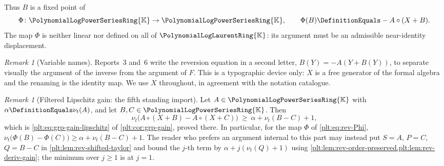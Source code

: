 \documentclass[11pt,oneside]{article}
\theoremstyle{plain}
\theoremstyle{definition}
\theoremstyle{remark}
\newtheorem{remark}[theorem]{Remark}
\newcommand{\K}{\mathbb{K}}
\newcommand{\PLpow}{\PolynomialLogPowerSeriesRing{\K}}   %
\newcommand{\PLlau}{\PolynomialLogLaurentRing{\K}}       %
\newcommand{\ordt}{\nu_{t}}                              %
\newcommand{\compose}{\mathbin{\circ}}
\begin{document}
Thus \(B\) is a fixed point of
\begin{equation}\label{plt:eq:rev-Phi}
 \Phi\colon\PLpow\to\PLpow,
 \qquad
 \Phi(B)\DefinitionEquals-A\compose(X+B).
\end{equation}
The map \(\Phi\) is neither linear nor defined on all of \(\PLlau\): its
argument must be an admissible near-identity displacement.

\begin{remark}[Variable names]
\label{plt:rmk:rev-variable-names}
Reports~3 and~6 write the reversion equation in a second letter,
\(B(Y)=-A(Y+B(Y))\), to separate visually the argument of the inverse from the
argument of \(F\).  This is a typographic device only: \(X\) is a free
generator of the formal algebra and the renaming is the identity map.  We use
\(X\) throughout, in agreement with the notation catalogue.
\end{remark}

\begin{remark}[Filtered Lipschitz gain: the fifth standing import]
\label{plt:lem:rev-gain}
Let \(A\in\PLpow\) with \(\alpha\DefinitionEquals\ordt(A)\), and let
\(B,C\in\PLpow\).  Then
\begin{equation}\label{plt:eq:rev-gain}
 \ordt\bigl(A\compose(X+B)-A\compose(X+C)\bigr)
 \ \ge\ \alpha+\ordt(B-C)+1 ,
\end{equation}
which is \eqref{plt:eq:grp-gain-lipschitz} of \cref{plt:cor:grp-gain}, proved
there.  In particular, for the map \(\Phi\) of \eqref{plt:eq:rev-Phi},
\(\ordt\bigl(\Phi(B)-\Phi(C)\bigr)\ge\alpha+\ordt(B-C)+1\).  The reader who
prefers an argument internal to this part may instead put \(S=A\), \(P=C\),
\(Q=B-C\) in \cref{plt:lem:rev-shifted-taylor} and bound the \(j\)-th term by
\(\alpha+j(\ordt(Q)+1)\) using
\cref{plt:lem:rev-order-preserved,plt:lem:rev-deriv-gain}; the minimum over
\(j\ge1\) is at \(j=1\).
\end{remark}
\end{document}

